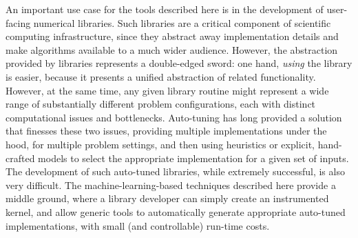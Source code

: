 \documentclass{sig-alternate}
\begin{document}
An important use case for the tools described here is in the development of
user-facing numerical libraries.  Such libraries are a critical component of
scientific computing infrastructure, since they abstract away implementation
details and make algorithms available to a much wider audience.  However, the
abstraction provided by libraries represents a double-edged sword: one hand,
\emph{using} the library is easier, because it presents a unified abstraction
of related functionality.  However, at the same time, any given library routine
might represent a wide range of substantially different problem configurations,
each with distinct computational issues and bottlenecks.  Auto-tuning has long
provided a solution that finesses these two issues, providing multiple
implementations under the hood, for multiple problem settings, and then using
heuristics or explicit, hand-crafted models to select the appropriate
implementation for a given set of inputs.  The development of such auto-tuned
libraries, while extremely successful, is also very difficult.  The
machine-learning-based techniques described here provide a middle ground, where
a library developer can simply create an instrumented kernel, and allow
generic tools to automatically generate appropriate auto-tuned implementations,
with small (and controllable) run-time costs.

\end{document}

